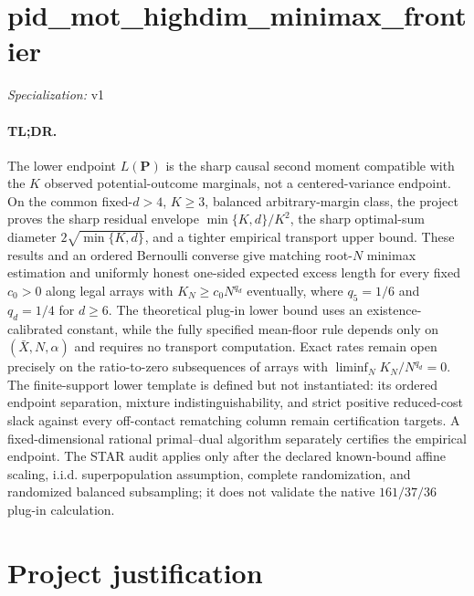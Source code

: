 \documentclass{article}
\begin{document}
\sloppy

\section*{pid\_\allowbreak{}mot\_\allowbreak{}highdim\_\allowbreak{}minimax\_\allowbreak{}frontier}

\noindent\textit{Specialization:} v1\par

\paragraph{TL;DR.} The lower endpoint \(L(\mathbf P)\) is the sharp causal second moment compatible with the \(K\) observed potential-outcome marginals, not a centered-variance endpoint.  On the common fixed-\(d>4\), \(K\ge3\), balanced arbitrary-margin class, the project proves the sharp residual envelope \(\min\{K,d\}/K^2\), the sharp optimal-sum diameter \(2\sqrt{\min\{K,d\}}\), and a tighter empirical transport upper bound.  These results and an ordered Bernoulli converse give matching root-\(N\) minimax estimation and uniformly honest one-sided expected excess length for every fixed \(c_0>0\) along legal arrays with \(K_N\ge c_0N^{q_d}\) eventually, where \(q_5=1/6\) and \(q_d=1/4\) for \(d\ge6\).  The theoretical plug-in lower bound uses an existence-calibrated constant, while the fully specified mean-floor rule depends only on \((\bar X,N,\alpha)\) and requires no transport computation.  Exact rates remain open precisely on the ratio-to-zero subsequences of arrays with \(\liminf_NK_N/N^{q_d}=0\).  The finite-support lower template is defined but not instantiated: its ordered endpoint separation, mixture indistinguishability, and strict positive reduced-cost slack against every off-contact rematching column remain certification targets.  A fixed-dimensional rational primal--dual algorithm separately certifies the empirical endpoint.  The STAR audit applies only after the declared known-bound affine scaling, i.i.d. superpopulation assumption, complete randomization, and randomized balanced subsampling; it does not validate the native \(161/37/36\) plug-in calculation.

\section{Project justification}
\end{document}

